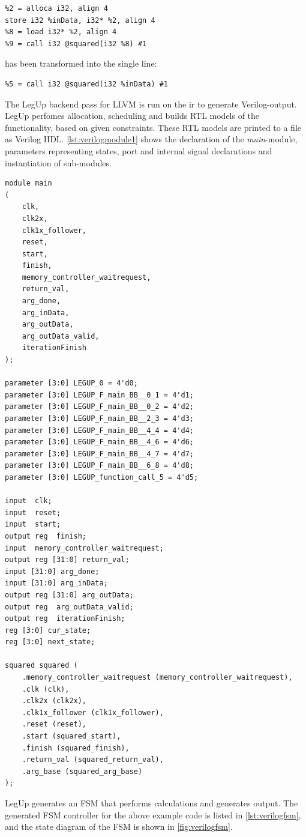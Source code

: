 \begin{lstlisting}
%2 = alloca i32, align 4
store i32 %inData, i32* %2, align 4
%8 = load i32* %2, align 4
%9 = call i32 @squared(i32 %8) #1
\end{lstlisting}
has been transformed into the single line:
\begin{lstlisting}
%5 = call i32 @squared(i32 %inData) #1
\end{lstlisting}
The LegUp backend pass for LLVM is run on the \gls{ir} to generate Verilog-output. LegUp perfomes allocation, scheduling and builds RTL models of the functionality, based on given constraints. These RTL models are printed to a file as Verilog HDL. \cref{lst:verilogmodule1} shows the declaration of the \textit{main}-module, parameters representing states, port and internal signal declarations and instantiation of sub-modules.
\lstset{language=Verilog, style=VerilogStyle}
\begin{lstlisting}[caption={Verilog module, port, signal and parameter declaration, and sub-module instantiation},label=lst:verilogmodule1]
module main
(
	clk,
	clk2x,
	clk1x_follower,
	reset,
	start,
	finish,
	memory_controller_waitrequest,
	return_val,
	arg_done,
	arg_inData,
	arg_outData,
	arg_outData_valid,
	iterationFinish
);

parameter [3:0] LEGUP_0 = 4'd0;
parameter [3:0] LEGUP_F_main_BB__0_1 = 4'd1;
parameter [3:0] LEGUP_F_main_BB__0_2 = 4'd2;
parameter [3:0] LEGUP_F_main_BB__2_3 = 4'd3;
parameter [3:0] LEGUP_F_main_BB__4_4 = 4'd4;
parameter [3:0] LEGUP_F_main_BB__4_6 = 4'd6;
parameter [3:0] LEGUP_F_main_BB__4_7 = 4'd7;
parameter [3:0] LEGUP_F_main_BB__6_8 = 4'd8;
parameter [3:0] LEGUP_function_call_5 = 4'd5;

input  clk;
input  reset;
input  start;
output reg  finish;
input  memory_controller_waitrequest;
output reg [31:0] return_val;
input [31:0] arg_done;
input [31:0] arg_inData;
output reg [31:0] arg_outData;
output reg  arg_outData_valid;
output reg  iterationFinish;
reg [3:0] cur_state;
reg [3:0] next_state;

squared squared (
	.memory_controller_waitrequest (memory_controller_waitrequest),
	.clk (clk),
	.clk2x (clk2x),
	.clk1x_follower (clk1x_follower),
	.reset (reset),
	.start (squared_start),
	.finish (squared_finish),
	.return_val (squared_return_val),
	.arg_base (squared_arg_base)
);
\end{lstlisting}
LegUp generates an FSM that performs calculations and generates output. The generated FSM controller for the above example code is listed in \cref{lst:verilogfsm}, and the state diagram of the FSM is shown in \cref{fig:verilogfsm}.
